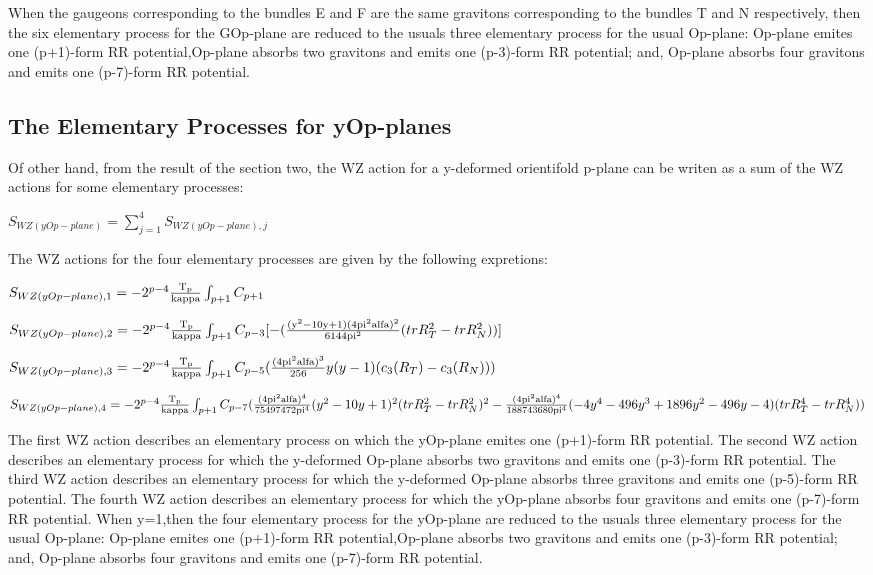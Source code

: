 \documentclass[a4paper,a4paper]{article}
\begin{document}
When the gaugeons corresponding to the bundles E and F are the same gravitons corresponding to the bundles T and N respectively, then the six elementary process for the GOp-plane are reduced to the usuals three elementary process for the usual Op-plane: Op-plane emites one (p+1)-form RR potential,Op-plane
absorbs two gravitons and emits one (p-3)-form RR potential; and, Op-plane absorbs four gravitons and emits one (p-7)-form RR potential.

\subsection{The Elementary Processes for yOp-planes }
Of other hand, from the result of the section two, the WZ action for a y-deformed orientifold p-plane can be writen as a sum of the WZ actions for some elementary processes:
\begin{center}
{  $ S_{WZ(yOp-plane)} = \sum_{j=1}^{4}S_{WZ(yOp-plane),j} $ }
\end{center}
The WZ actions for the four elementary processes are given by the following 
expretions:
\begin{center}
{  $ S_{WZ(yOp-plane),1} = -2^{p-4}\frac{\rm T_p}{\rm kappa}\int_{p+1} C_{p+1}$ }
\end{center} 
\begin{center}
{  $ S_{WZ(yOp-plane),2} = -2^{p-4}\frac{\rm T_p}{\rm kappa}\int_{p+1} C_{p-3}[-({\frac{\rm(y^2-10y+1)(4pi^2alfa)^2 }{\rm 6144pi^2}}{(trR_T^2- trR_N^2)})]$ }
\end{center}
\begin{center}
{  $ S_{WZ(yOp-plane),3} = -2^{p-4}\frac{\rm T_p}{\rm kappa}\int_{p+1} C_{p-5}(\frac{\rm (4pi^2alfa)^3}{\rm 256}{{y(y-1)(c_3(R_T)- c_3(R_N)))}}$ }
\end{center}
\begin{center}
{  $ S_{WZ(yOp-plane),4} = -2^{p-4}\frac{\rm T_p}{\rm kappa}\int_{p+1} C_{p-7}(\frac{\rm (4pi^2alfa)^4}{\rm 75497472pi^4}{{(y^2-10y+1)^2(trR_T^2-trR_N^2)^2}}-\frac{\rm(4pi^2alfa)^4 }{\rm 188743680pi^4}{(-4y^4-496y^3+1896y^2-496y-4)(trR_T^4- trR_N^4)})$ }
\end{center}

The first WZ action describes an elementary process on which the yOp-plane emites one (p+1)-form RR potential.
The second WZ action describes an elementary process for which the y-deformed
Op-plane absorbs two gravitons and emits one (p-3)-form RR potential.
The third WZ action describes an elementary process for which the y-deformed
Op-plane absorbs three gravitons and emits one (p-5)-form RR potential.
The fourth WZ action describes an elementary process for which the yOp-plane absorbs four gravitons and emits one (p-7)-form RR potential.
When y=1,then the four elementary process for the yOp-plane are reduced to the usuals three elementary process for the usual Op-plane: Op-plane emites one (p+1)-form RR potential,Op-plane
absorbs two gravitons and emits one (p-3)-form RR potential; and, Op-plane absorbs four gravitons and emits one (p-7)-form RR potential.
\end{document}

